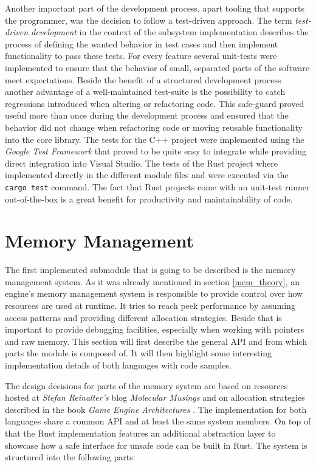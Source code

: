 Another important part of the development process, apart tooling that supports the programmer, was the decision to follow a test-driven approach. The term \textit{test-driven development} in the context of the subsystem implementation describes the process of defining the wanted behavior in test cases and then implement functionality to pass these tests. For every feature several unit-tests were implemented to ensure that the behavior of small, separated parts of the software meet expectations. Beside the benefit of a structured development process another advantage of a well-maintained test-suite is the possibility to catch regressions introduced when altering or refactoring code. This safe-guard proved useful more than once during the development process and ensured that the behavior did not change when refactoring code or moving reusable functionality into the core library. The tests for the C++ project were implemented using the \textit{Google Test Framework} that proved to be quite easy to integrate while providing direct integration into Visual Studio. The tests of the Rust project where implemented directly in the different module files and were executed via the \texttt{cargo test} command. The fact that Rust projects come with an unit-test runner out-of-the-box is a great benefit for productivity and maintainability of code. 

\section{Memory Management} \label{mem_impl}

The first implemented submodule that is going to be described is the memory management system. As it was already mentioned in section \ref{mem_theory}, an engine's memory management system is responsible to provide control over how resources are used at runtime. It tries to reach peek performance by assuming access patterns and providing different allocation strategies. Beside that is important to provide debugging facilities, especially when working with pointers and raw memory. This section will first describe the general \ac{API} and from which parts the module is composed of. It will then highlight some interesting implementation details of both languages with code samples.

The design decisions for parts of the memory system are based on resources hosted at \textit{Stefan Reinalter's} blog \textit{Molecular Musings} \cite{MOL_MS_1} \cite{MOL_MS_2} \cite{MOL_MS_3} \cite{MOL_MS_4} \cite{MOL_MS_5} and on allocation strategies described in the book \textit{Game Engine Architectures} \cite{GEA_2}. The implementation for both languages share a common \ac{API} and at least the same system members. On top of that the Rust implementation features an additional abstraction layer to showcase how a safe interface for unsafe code can be built in Rust. The system is structured into the following parts:

